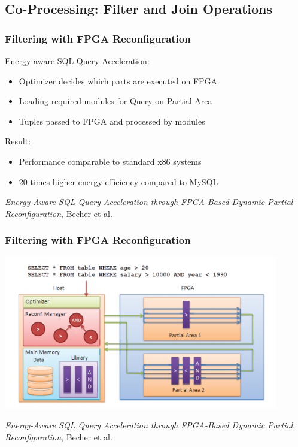 \documentclass{beamer}
\begin{document}
\subsection{Co-Processing: Filter and Join Operations}
\begin{frame}
\frametitle{Filtering with FPGA Reconfiguration}
Energy aware SQL Query Acceleration:
\begin{itemize}
	\item Optimizer decides which parts are executed on FPGA
	\item Loading required modules for Query on Partial Area
	\item Tuples passed to FPGA and processed by modules
\end{itemize}
\vspace*{0.3cm}
Result:
\begin{itemize}
	\item Performance comparable to standard x86 systems
	\item 20 times higher energy-efficiency compared to MySQL
\end{itemize}
\begin{center}
	\small \emph{Energy-Aware SQL Query Acceleration through FPGA-Based Dynamic Partial Reconfiguration}, Becher et al.
\end{center}
\end{frame}

\begin{frame}
	\frametitle{Filtering with FPGA Reconfiguration}
	\includegraphics[width=0.9\textwidth]{img/reconf.png}
	\begin{center}
		\small \emph{Energy-Aware SQL Query Acceleration through FPGA-Based Dynamic Partial Reconfiguration}, Becher et al.
	\end{center}
\end{frame}
\end{document}
